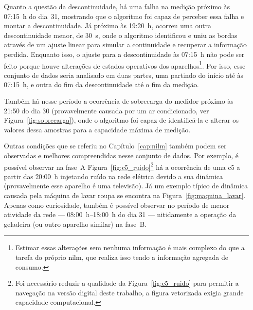 Quanto a questão da descontinuidade, há uma falha na medição próximo
às 07:15~h do dia~31, mostrando que o algoritmo foi capaz de perceber
essa falha e montar a descontinuidade. Já próximo às 19:20~h, ocorreu
uma outra descontinuidade menor, de 30~s, onde o algoritmo identificou
e uniu as bordas através de um ajuste linear para simular a
continuidade e recuperar a informação perdida. Enquanto isso, o ajuste para a
descontinuidade às 07:15~h não pode ser feito porque houve alterações
de estados operativos dos aparelhos\footnote{Estimar essas
alterações sem nenhuma informação é mais complexo do que a tarefa do
próprio \acs{nilm}, que realiza isso tendo a informação agregada de
consumo.}. Por isso, esse conjunto de dados seria analisado em duas
partes, uma partindo do início até às 07:15~h, e outra do fim da
descontinuidade até o fim da medição.

Também há nesse período a ocorrência de sobrecarga do medidor próximo
às 21:50 do dia 30 (provavelmente causada por um ar condicionado, ver
Figura~\ref{fig:sobrecarga}), onde o algoritmo foi capaz de
identificá-la e alterar os valores dessa amostras para a capacidade
máxima de medição.

Outras condições que se referiu no Capítulo~\ref{cap:nilm} também
podem ser observadas e melhores compreendidas nesse conjunto de dados.
Por exemplo, é possível observar na fase~A
Figura~\ref{fig:c5_ruido}\footnote{Foi necessário reduzir a qualidade
da Figura~\ref{fig:c5_ruido} para permitir a navegação na versão
digital deste trabalho, a figura vetorizada exigia grande capacidade
computacional.}
há a ocorrência de uma \gls{c5} a partir das
20:00~h injetando ruído na rede elétrica devido a sua dinâmica
(provavelmente esse aparelho é uma televisão). Já um exemplo típico de dinâmica causada
pela máquina de lavar roupa se encontra na
Figura~\ref{fig:maquina_lavar}. Apenas como curiosidade, também é
possível observar no período de menor atividade da rede ---
08:00~h--18:00~h do dia 31 --- nitidamente a operação da geladeira (ou
outro aparelho similar) na fase~B.

